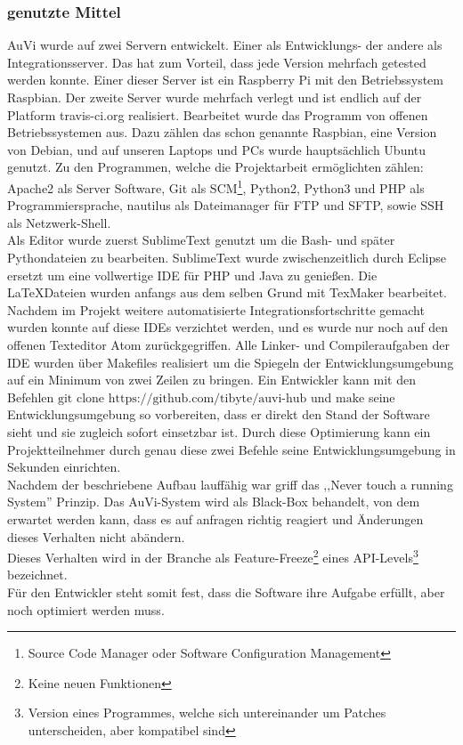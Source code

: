 \subsubsection{genutzte Mittel} %
AuVi wurde auf zwei Servern entwickelt. Einer als Entwicklungs- der andere als Integrationsserver.
Das hat zum Vorteil, dass jede Version mehrfach getested werden konnte.
Einer dieser Server ist ein Raspberry Pi mit den Betriebssystem Raspbian.
Der zweite Server wurde mehrfach verlegt und ist endlich auf der Platform travis-ci.org realisiert.
Bearbeitet wurde das Programm von offenen Betriebssystemen aus. Dazu zählen das schon genannte
Raspbian, eine Version von Debian, und auf unseren Laptops und PCs wurde hauptsächlich Ubuntu genutzt.
Zu den Programmen, welche die Projektarbeit ermöglichten zählen: Apache2 als Server
Software, Git als SCM\footnote{Source Code Manager oder Software Configuration Management},
Python2, Python3 und PHP als Programmiersprache, nautilus als Dateimanager für FTP und SFTP, sowie
SSH als Netzwerk-Shell.\\
Als Editor wurde zuerst SublimeText genutzt um die Bash- und später Pythondateien zu bearbeiten.
SublimeText wurde zwischenzeitlich durch Eclipse ersetzt um eine vollwertige IDE für PHP und Java zu
genießen. Die \LaTeX Dateien wurden anfangs aus dem selben Grund mit TexMaker bearbeitet.
Nachdem im Projekt weitere automatisierte Integrationsfortschritte gemacht wurden konnte auf
diese IDEs verzichtet werden, und es wurde nur noch auf den offenen Texteditor Atom zurückgegriffen.
Alle Linker- und Compileraufgaben der IDE wurden über Makefiles realisiert um die Spiegeln der
Entwicklungsumgebung auf ein Minimum von zwei Zeilen zu bringen. Ein Entwickler kann mit den
Befehlen $\text{git clone https://github.com/tibyte/auvi-hub}$ und $\text{make}$ seine Entwicklungsumgebung
so vorbereiten, dass er direkt den Stand der Software sieht und sie zugleich sofort einsetzbar ist.
Durch diese Optimierung kann ein Projektteilnehmer durch genau diese zwei Befehle seine Entwicklungsumgebung
in Sekunden einrichten.\\
Nachdem der beschriebene Aufbau lauffähig war griff das ,,Never touch a running System'' Prinzip.
Das AuVi-System wird als Black-Box behandelt, von dem erwartet werden kann, dass es auf anfragen
richtig reagiert und Änderungen dieses Verhalten nicht abändern.\\
Dieses Verhalten wird in der Branche als Feature-Freeze\footnote{Keine neuen Funktionen}
eines API-Levels\footnote{Version eines Programmes, welche sich untereinander um Patches unterscheiden,
aber kompatibel sind} \cite{semver} bezeichnet.\\
Für den Entwickler steht somit fest, dass die Software ihre Aufgabe erfüllt, aber noch optimiert
werden muss.

